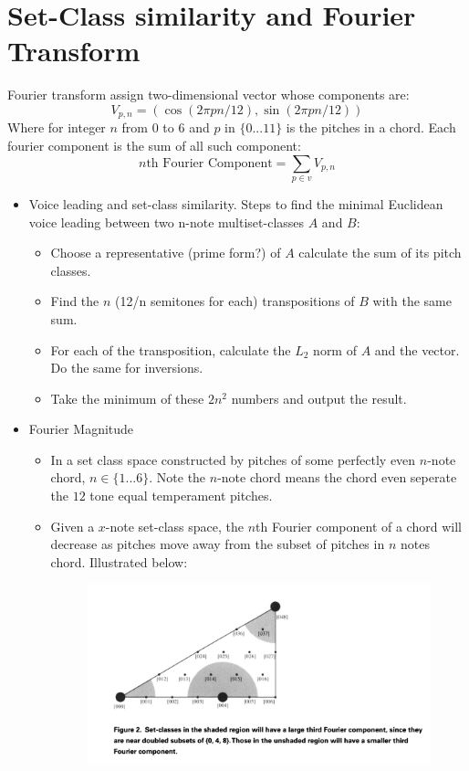 \documentclass[12pt]{report}
\theoremstyle{definition}
\begin{document}
\section*{Set-Class similarity and Fourier Transform}
Fourier transform assign two-dimensional vector whose components are:
\[V_{p,n}=(\cos(2\pi pn/12), \sin(2\pi pn/12))\]
Where for integer $n$ from $0$ to $6$ and $p$ in $\{0...11\}$ is the pitches
in a chord. Each fourier component is the sum of all such component:
\[n\text{th Fourier Component}=\sum_{p\in v}V_{p,n}\]
\begin{itemize}
    \item Voice leading and set-class similarity. Steps
    to find the minimal Euclidean voice leading between two n-note 
    multiset-classes $A$ and $B$:
        \begin{itemize}
            \item Choose a representative (prime form?) of $A$ calculate 
            the sum of its pitch classes.
            \item Find the $n$ (12/n semitones for each) 
            transpositions of $B$ with the same sum.
            \item For each of the transposition, calculate the $L_2$
            norm of $A$ and the vector. Do the same for inversions.
            \item Take the minimum of these $2n^2$ numbers and output the 
            result.
        \end{itemize}
    \item Fourier Magnitude
        \begin{itemize}
            \item In a set class space constructed by pitches of some 
            perfectly even $n$-note chord, $n\in\{1...6\}$. Note the $n$-note
            chord means the chord even seperate the $12$ tone equal 
            temperament pitches. 
            \item Given a $x$-note set-class space, the $n$th Fourier component of a chord will decrease 
            as pitches move away from the subset of pitches in $n$ notes 
            chord. Illustrated below:
            \begin{figure}[h]
                \includegraphics[scale=0.5]{Tymoczko_1.png}

\end{figure}
\end{itemize}
\end{itemize}
\end{document}
